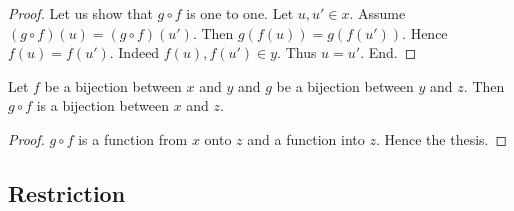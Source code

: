 \documentclass[../../set-theory.ftl.tex]{subfiles}
\begin{document}
\begin{forthel}
\begin{proof}
      Let us show that $g \circ f$ is one to one.
        Let $u,u' \in x$.
        Assume $(g \circ f)(u) = (g \circ f)(u')$.
        Then $g(f(u)) = g(f(u'))$.
        Hence $f(u) = f(u')$.
        Indeed $f(u), f(u') \in y$.
        Thus $u = u'$.
      End.
    \end{proof}

    \begin{corollary}\label{SetTheory_02_01_627406}
      Let $f$ be a bijection between $x$ and $y$ and $g$ be a bijection between $y$ and $z$.
      Then $g \circ f$ is a bijection between $x$ and $z$.
    \end{corollary}
    \begin{proof}
      $g \circ f$ is a function from $x$ onto $z$ and a function into $z$.
      Hence the thesis.
    \end{proof}
  \end{forthel}


  \subsection{Restriction}
\end{document}
